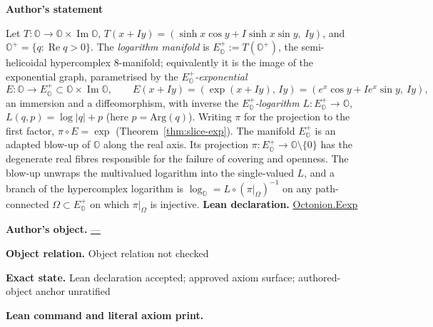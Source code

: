 \documentclass[11pt]{article}
\newcommand{\OO}{\mathbb{O}}
\DeclareMathOperator{\re}{Re}
\DeclareMathOperator{\im}{Im}
\theoremstyle{plain}
\theoremstyle{definition}
\theoremstyle{remark}
\begin{document}
\begin{tcolorbox}[provenancecard,title={24. Theorem - The logarithm manifold \$E\textasciicircum{}\{+\}\_\{\textbackslash{}OO\}\$; \textbackslash{}protect\{\textbackslash{}cite[Prop.\textasciitilde{}5.1, Rem.\textasciitilde{}5.2, Def.\textasciitilde{}5.3, Prop.\textasciitilde{}5.4, Def.\textasciitilde{}5.5]\{VS\}; \textbackslash{}cite[\textbackslash{}S3]\{GPVwind\}\}},title after break={24. Theorem - The logarithm manifold \$E\textasciicircum{}\{+\}\_\{\textbackslash{}OO\}\$; \textbackslash{}protect\{\textbackslash{}cite[Prop.\textasciitilde{}5.1, Rem.\textasciitilde{}5.2, Def.\textasciitilde{}5.3, Prop.\textasciitilde{}5.4, Def.\textasciitilde{}5.5]\{VS\}; \textbackslash{}cite[\textbackslash{}S3]\{GPVwind\}\} (continued)}]
\textbf{Author's statement}\par
Let $T:\OO\to\OO\times\im\OO$, $T(x+Iy)=(\sinh x\cos y+I\sinh x\sin y,\ Iy)$, and
$\OO^{+}=\{q:\re q>0\}$. The \emph{logarithm manifold} is $E^{+}_{\OO}:=T(\OO^{+})$, the
semi-helicoidal hypercomplex $8$-manifold; equivalently it is the image of the exponential
graph, parametrised by the \emph{$E^{+}_{\OO}$-exponential}
\[
E:\OO\longrightarrow E^{+}_{\OO}\subset\OO\times\im\OO,\qquad
E(x+Iy)=(\exp(x+Iy),\,Iy)=(e^{x}\cos y+Ie^{x}\sin y,\ Iy),
\]
an immersion and a diffeomorphism, with inverse the \emph{$E^{+}_{\OO}$-logarithm}
$L:E^{+}_{\OO}\to\OO$, $L(q,p)=\log|q|+p$ (here $p=\mathrm{Arg}(q)$). Writing $\pi$ for the
projection to the first factor, $\pi\circ E=\exp$ (Theorem~\ref{thm:slice-exp}). The manifold
$E^{+}_{\OO}$ is an adapted blow-up of $\OO$ along the real axis. Its projection
$\pi:E^{+}_{\OO}\to\OO\setminus\{0\}$ has the degenerate real fibres responsible for the
failure of covering and openness. The blow-up unwraps the multivalued logarithm into the
single-valued $L$, and a branch of the
hypercomplex logarithm is $\log_{\OO}=L\circ(\pi|_{\Omega})^{-1}$ on any path-connected
$\Omega\subset E^{+}_{\OO}$ on which $\pi|_{\Omega}$ is injective.
\tcblower
\textbf{Lean declaration.} \url{Octonion.Eexp}
\par\textbf{Author's object.} \url{—}
\par\textbf{Object relation.} Object relation not checked
\par\textbf{Exact state.} Lean declaration accepted; approved axiom surface; authored-object anchor unratified
\par\smallskip\textbf{Lean command and literal axiom print.}
\begin{Verbatim}[breaklines=true,breakanywhere=true,fontsize=\small]

\end{Verbatim}
\end{tcolorbox}
\end{document}
